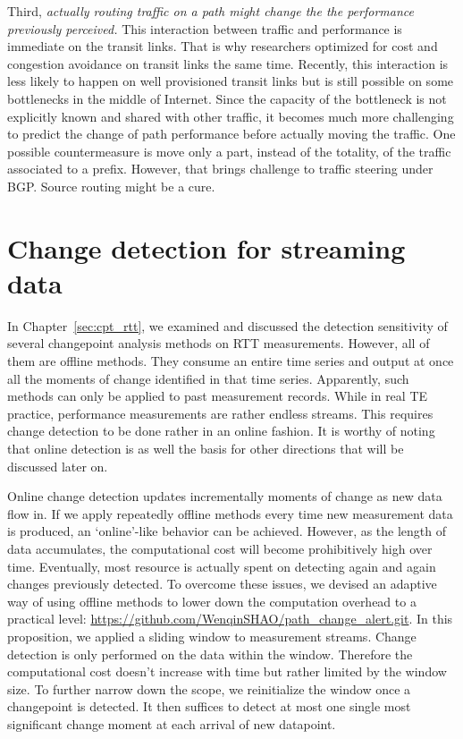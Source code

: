 Third, \textit{actually routing traffic on a path might change the the performance previously perceived.} This interaction between traffic and performance is immediate on the transit links. That is why researchers optimized for cost and congestion avoidance on transit links the same time. Recently, this interaction is less likely to happen on well provisioned transit links but is still possible on some bottlenecks in the middle of Internet. Since the capacity of the bottleneck is not explicitly known and shared with other traffic, it becomes much more challenging to predict the change of path performance before actually moving the traffic. 
One possible countermeasure is move only a part, instead of the totality, of the traffic associated to a prefix.
However, that brings challenge to traffic steering under BGP. 
Source routing might be a cure.


\section{Change detection for streaming data}
In Chapter~\ref{sec:cpt_rtt}, we examined and discussed the detection sensitivity of several changepoint analysis methods on RTT measurements. However, all of them are offline methods. They consume an entire time series and output at once all the moments of change identified in that time series.
Apparently, such methods can only be applied to past measurement records. 
While in real TE practice, performance measurements are rather endless streams. This requires change detection to be done rather in an online fashion. 
It is worthy of noting that online detection is as well the basis for other directions that will be discussed later on.

Online change detection updates incrementally moments of change as new data flow in.
If we apply repeatedly offline methods every time new measurement data is produced, an `online'-like behavior can be achieved. However, as the length of data accumulates, the computational cost will become prohibitively high over time. Eventually, most resource is actually spent on detecting again and again changes previously detected.
To overcome these issues, we devised an adaptive way of using offline methods to lower down the computation overhead to a practical level: \url{https://github.com/WenqinSHAO/path_change_alert.git}. 
In this proposition, we applied a sliding window to measurement streams. 
Change detection is only performed on the data within the window.
Therefore the computational cost doesn't increase with time but rather limited by the window size. 
To further narrow down the scope, we reinitialize the window once a changepoint is detected. It then suffices to detect at most one single most significant change moment at each arrival of new datapoint.

